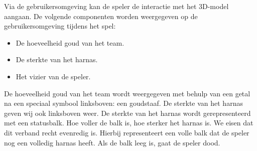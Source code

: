 Via de gebruikersomgeving kan de speler de interactie met het 3D-model aangaan. De volgende componenten worden weergegeven op de gebruikersomgeving tijdens het spel:
\begin{itemize}
\item De hoeveelheid goud van het team.
\item De sterkte van het harnas.
\item Het vizier van de speler.
\end{itemize}

De hoeveelheid goud van het team wordt weergegeven met behulp van een getal na een speciaal symbool linksboven: een goudstaaf. De sterkte van het harnas geven wij ook linksboven weer. De sterkte van het harnas wordt gerepresenteerd met een statusbalk. Hoe voller de balk is, hoe sterker het harnas is. We eisen dat dit verband recht evenredig is. Hierbij representeert een volle balk dat de speler nog een volledig harnas heeft. Als de balk leeg is, gaat de speler dood.

